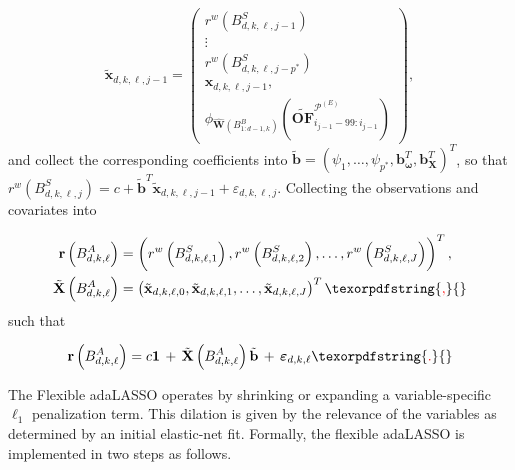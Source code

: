 \documentclass[10pt,a4paper,oneside]{article}
\providecommand{\DIFdeltex}[1]{{\protect\color{red} \scriptsize #1}} %
\providecommand{\DIFaddbegin}{} %
\providecommand{\DIFaddend}{} %
\providecommand{\DIFdelbegin}{} %
\providecommand{\DIFdelend}{} %
\providecommand{\DIFdel}[1]{\texorpdfstring{\DIFdeltex{#1}}{}} %
\newcommand{\DIFscaledelfig}{0.5}
\newlength{\DIFdelgraphicswidth} %
\newlength{\DIFdelgraphicsheight} %
\newcommand{\DIFaddincludegraphics}[2][]{{\color{blue}\fbox{\DIFOincludegraphics[#1]{#2}}}} %
\newcommand{\DIFdelincludegraphics}[2][]{%
\sbox{\DIFdelgraphicsbox}{\DIFOincludegraphics[#1]{#2}}%
\settoboxwidth{\DIFdelgraphicswidth}{\DIFdelgraphicsbox} %
\settoboxtotalheight{\DIFdelgraphicsheight}{\DIFdelgraphicsbox} %
\scalebox{\DIFscaledelfig}{%
\parbox[b]{\DIFdelgraphicswidth}{\usebox{\DIFdelgraphicsbox}\\[-\baselineskip] \rule{\DIFdelgraphicswidth}{0em}}\llap{\resizebox{\DIFdelgraphicswidth}{\DIFdelgraphicsheight}{%
\setlength{\unitlength}{\DIFdelgraphicswidth}%
\begin{picture}(1,1)%
\thicklines\linethickness{2pt} %
{\color[rgb]{1,0,0}\put(0,0){\framebox(1,1){}}}%
{\color[rgb]{1,0,0}\put(0,0){\line( 1,1){1}}}%
{\color[rgb]{1,0,0}\put(0,1){\line(1,-1){1}}}%
\end{picture}%
}\hspace*{3pt}}} %
} %
\DeclareRobustCommand{\DIFaddbegin}{\DIFOaddbegin \let\includegraphics\DIFaddincludegraphics} %
\DeclareRobustCommand{\DIFaddend}{\DIFOaddend \let\includegraphics\DIFOincludegraphics} %
\DeclareRobustCommand{\DIFdelbegin}{\DIFOdelbegin \let\includegraphics\DIFdelincludegraphics} %
\DeclareRobustCommand{\DIFdelend}{\DIFOaddend \let\includegraphics\DIFOincludegraphics} %
\begin{document}
\[
    \tilde{\mathbf{x}}_{d,k,\ell,j - 1}
    =
    \begin{pmatrix}
        r^w \left( B^S_{d, k, \ell, j - 1} \right)   \\
        \vdots                                       \\
        r^w \left( B^S_{d, k, \ell, j - p^*} \right) \\
        \mathbf{x}_{d, k, \ell, j - 1},              \\
        \phi_{\hat{\mathbf{W}}\left( B^B_{1:d - 1, k} \right)}\left( \widetilde{\mathbf{OF}}^{\mathcal{P}^{(E)}}_{i_{j - 1} - 99:i_{j - 1}} \right)
    \end{pmatrix},
\]
and collect the corresponding coefficients into \(\tilde{\mathbf{b}} = \left( \psi_1, \dots, \psi_{p^*}, \mathbf{b}^T_{\boldsymbol{\omega}}, \mathbf{b}^T_{\mathbf{X}}\right)^T\), so that \(r^w\left( B^S_{d,k,\ell,j} \right) = c + \tilde{\mathbf{b}}^T\tilde{\mathbf{x}}_{d, k, \ell, j - 1} + \varepsilon_{d,k,\ell, j}\). Collecting the observations and covariates into

\begin{align*}
    \mathbf{r}\left( B^A_{d, k, \ell} \right)         & = \left( r^w\left( B^S_{d, k, \ell, 1} \right), r^w\left( B^S_{d, k, \ell, 2}\right), \dots, r^w\left( B^S_{d, k, \ell, J} \right) \right)^T, \\
    \tilde{\mathbf{X}}\left( B^A_{d, k, \ell} \right) & = \left( \tilde{\mathbf{x}}_{d,k,\ell,0}, \tilde{\mathbf{x}}_{d,k,\ell,1}, \dots, \tilde{\mathbf{x}}_{d,k,\ell,J}  \right)^T
\DIFdelbegin \DIFdel{,
}\DIFdelend \end{align*}
such that
\DIFaddbegin 

\DIFaddend \begin{align*}
    \mathbf{r}\left( B^A_{d, k, \ell} \right) = c \mathbf{1} \, + \, \tilde{\mathbf{X}}\left( B^A_{d, k, \ell} \right) \tilde{\mathbf{b}} \, + \, \boldsymbol{\varepsilon}_{d, k, \ell}
\DIFdelbegin \DIFdel{.
}\DIFdelend \end{align*}


The Flexible adaLASSO operates by shrinking or expanding a variable-specific $\ell_1$ penalization term. This dilation is given by the relevance of the variables as determined by an initial elastic-net fit. Formally, the flexible adaLASSO is implemented in two steps as follows.
\end{document}
